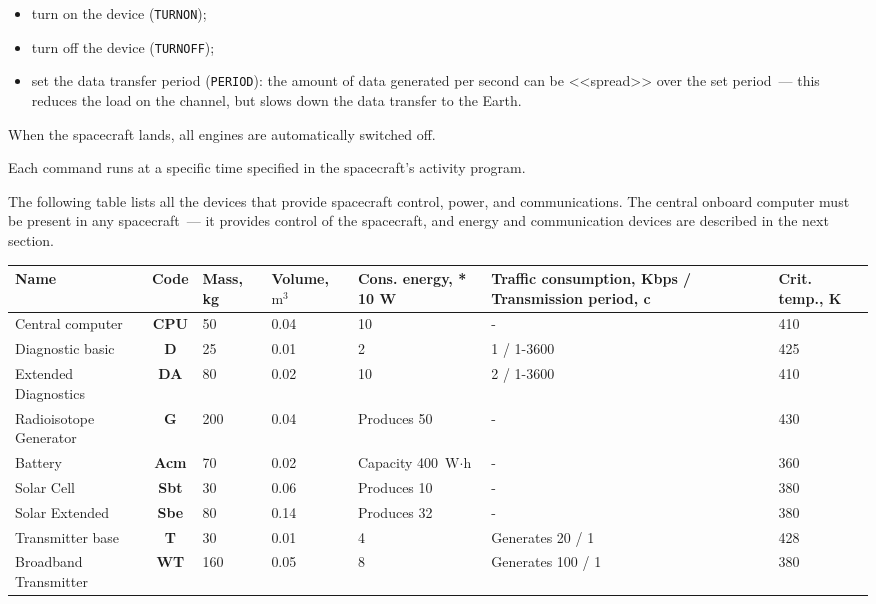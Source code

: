 \documentclass[12pt,a4paper]{article}
\begin{document}
\begin{itemize}
\item turn on the device (\verb'TURNON');
\item turn off the device (\verb'TURNOFF');
\item set the data transfer period (\verb'PERIOD'): the amount of data generated per second can be <<spread>> over the set period~--- this reduces the load on the channel, but slows down the data transfer to the Earth.
\end{itemize}

When the spacecraft lands, all engines are automatically switched off.

Each command runs at a specific time specified in the spacecraft's activity program.

The following table lists all the devices that provide spacecraft control, power, and communications. The central onboard computer must be present in any spacecraft~--- it provides control of the spacecraft, and energy and communication devices are described in the next section.

\begin{center}
\begin{tabular}{ |p{3cm}|c|p{1.5cm}|p{1.5cm}|p{2.5cm}|p{3cm}|p{1.5cm}| }
  \hline
  \textbf{Name} & \textbf{Code} & \textbf{Mass, kg} & \textbf{Volume, $\text{m}^3$} &
   \textbf{Cons. energy, * 10 W} & \textbf{Traffic consumption, Kbps / Transmission period,
     c} & \textbf{Crit. temp., K}\\
   \hline
   Central computer & \textbf{CPU} & 50 & 0.04 & 10 & - & 410 \\
   \hline
   Diagnostic basic & \textbf{D} & 25 & 0.01 & 2 & 1 / 1-3600 & 425 \\
   \hline
   Extended Diagnostics & \textbf{DA} & 80 & 0.02 & 10 & 2 / 1-3600 & 410\\
   \hline
   Radioisotope Generator & \textbf{G} & 200 & 0.04 & Produces 50 & - & 430\\
   \hline
   Battery & \textbf{Acm} & 70 & 0.02 & Capacity 400 $\text{W}\cdot\text{h}$& - & 360\\
   \hline
   Solar Cell & \textbf{Sbt} & 30 & 0.06 & Produces 10 & - & 380\\
   \hline
   Solar Extended & \textbf{Sbe} & 80 & 0.14 & Produces 32 & - & 380\\
   \hline
   Transmitter base & \textbf{T} & 30 & 0.01 & 4 & Generates 20 / 1 & 428\\
   \hline
   Broadband Transmitter & \textbf{WT} & 160 & 0.05 & 8 & Generates 100 / 1 & 380\\
   \hline
\end{tabular}
\end{center}
\end{document}
